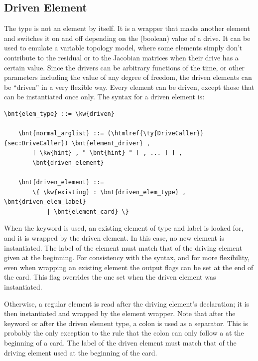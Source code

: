 \subsection{Driven Element}\label{sec:EL:BASE:DRIVEN}
The  type is not an element by itself. It is a wrapper that
masks another element and switches it on and off depending on the (boolean)
value of a drive. It can be used to emulate a variable topology model,
where some elements simply don't contribute to the residual
or to the Jacobian matrices when their drive has a certain value.
Since the drivers can be arbitrary functions of the time, 
or other parameters including the value of any degree of freedom, 
the driven elements can be ``driven'' in a very flexible way.
Every element can be driven, except those that can be instantiated once only.
The syntax for a driven element is:
\begin{Verbatim}[commandchars=\\\{\}]
    \bnt{elem_type} ::= \kw{driven}

    \bnt{normal_arglist} ::= (\htmlref{\ty{DriveCaller}}{sec:DriveCaller}) \bnt{element_driver} ,
        [ \kw{hint} , " \bnt{hint} " [ , ... ] ] ,
        \bnt{driven_element}

    \bnt{driven_element} ::=
        \{ \kw{existing} : \bnt{driven_elem_type} , \bnt{driven_elem_label}
            | \bnt{element_card} \}
\end{Verbatim}
When the keyword  is used, an existing element 
of type  and label  is looked for, 
and it is wrapped by the driven element.
In this case, no new element is instantiated.
The label of the element must match that of the driving element given 
at the beginning.
For consistency with the syntax, and for more flexibility, 
even when wrapping an existing element the output flags can be set
at the end of the card.
This flag overrides the one set when the driven element was instantiated.

Otherwise, a regular element is read after the driving element's declaration;
it is then instantiated and wrapped by the  element wrapper.
Note that after the keyword  or after the driven element type,
a colon is used as a separator.
This is probably the only exception to the rule that the colon
can only follow a  at the beginning of a card.
The label  of the driven element must match that
of the driving element used at the beginning of the  card.

